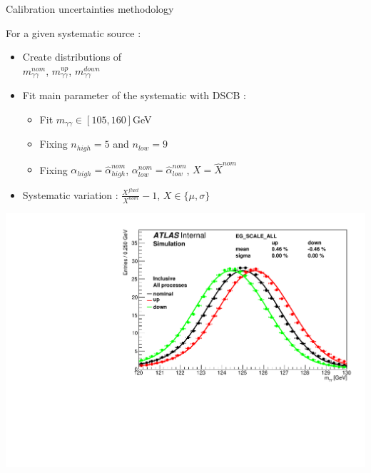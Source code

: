 \begin{frame}{Calibration uncertainties methodology}
  \begin{minipage}{0.49\linewidth}
    For a given systematic source :
    \begin{itemize}
    \item Create distributions of \\ $m_{\gamma\gamma}^{nom}$, $m_{\gamma\gamma}^{up}$, $m_{\gamma \gamma}^{down}$
    \item Fit main parameter of the systematic with DSCB :
      \begin{itemize}
      \item Fit  $m_{\gamma\gamma}\in[105,160]$GeV
      \item Fixing $n_{high}=5$ and $n_{low}=9$
      \item Fixing $\alpha_{high}=\hat{\alpha}_{high}^{nom}$, $\alpha_{low}^{nom}=\hat{\alpha}_{low}^{nom}$, $X=\hat{X}^{nom}$
      \end{itemize}
      \item Systematic variation : $\frac{X^{fluct}}{X^{nom}}-1$, $X\in \{\mu , \sigma\}$
      \end{itemize}
    \end{minipage}
    \hfill
    \begin{minipage}{0.49\linewidth}
      \includegraphics[width=\linewidth]{Figures/h013_EG_SCALE_ALL_0.pdf}
    \end{minipage}
    \vfill
    

\end{frame}
